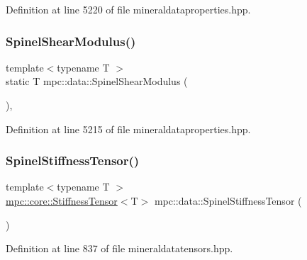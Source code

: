 Definition at line 5220 of file mineraldataproperties.\+hpp.

\mbox{\label{namespacempc_1_1data_aabedfbfc2ba1f2070fbc174a010f34af}} 
\subsubsection{\texorpdfstring{Spinel\+Shear\+Modulus()}{SpinelShearModulus()}}
{\footnotesize\ttfamily template$<$typename T $>$ \\
static T mpc\+::data\+::\+Spinel\+Shear\+Modulus (\begin{DoxyParamCaption}{ }\end{DoxyParamCaption})\hspace{0.3cm}{\ttfamily [inline]}, {\ttfamily [static]}}



Definition at line 5215 of file mineraldataproperties.\+hpp.

\mbox{\label{namespacempc_1_1data_ac060daa7aa19b1d60f0831f6173589bb}} 
\subsubsection{\texorpdfstring{Spinel\+Stiffness\+Tensor()}{SpinelStiffnessTensor()}}
{\footnotesize\ttfamily template$<$typename T $>$ \\
\mbox{\hyperlink{structmpc_1_1core_1_1_stiffness_tensor}{mpc\+::core\+::\+Stiffness\+Tensor}}$<$T$>$ mpc\+::data\+::\+Spinel\+Stiffness\+Tensor (\begin{DoxyParamCaption}{ }\end{DoxyParamCaption})}



Definition at line 837 of file mineraldatatensors.\+hpp.

\mbox{\label{namespacempc_1_1data_af9f4c7d0fb0848abec9e09e956226405}} 
